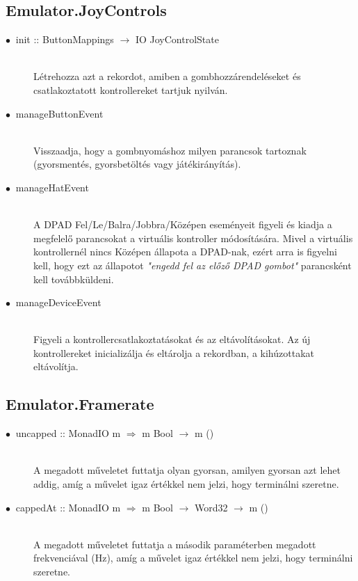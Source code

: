 \subsection{Emulator.JoyControls}

\begin{description}
	\item[$\bullet\:$ init :: ButtonMappings $\rightarrow$ IO JoyControlState] \hfill \\
	Létrehozza azt a rekordot, amiben a gombhozzárendeléseket és csatlakoztatott kontrollereket tartjuk nyilván.
	\item[$\bullet\:$ manageButtonEvent] \hfill \\
	Visszaadja, hogy a gombnyomáshoz milyen parancsok tartoznak (gyorsmentés, gyorsbetöltés vagy játékirányítás). 
	\item[$\bullet\:$ manageHatEvent] \hfill \\
	A DPAD Fel/Le/Balra/Jobbra/Középen eseményeit figyeli és kiadja a megfelelő parancsokat a virtuális kontroller módosítására. Mivel a virtuális kontrollernél nincs Középen állapota a DPAD-nak, ezért arra is figyelni kell, hogy ezt az állapotot \emph{"engedd fel az előző DPAD gombot"} parancsként kell továbbküldeni.
	\item[$\bullet\:$ manageDeviceEvent] \hfill \\
	Figyeli a kontrollercsatlakoztatásokat és az eltávolításokat.
	Az új kontrollereket inicializálja és eltárolja a rekordban, a kihúzottakat eltávolítja.
\end{description}

\subsection{Emulator.Framerate}

\begin{description}
	\item[$\bullet\:$ uncapped :: MonadIO m $\Rightarrow$ m Bool $\rightarrow$ m ()] \hfill \\
	A megadott műveletet futtatja olyan gyorsan, amilyen gyorsan azt lehet addig, amíg a művelet igaz értékkel nem jelzi, hogy terminálni szeretne.
	\item[$\bullet\:$ cappedAt :: MonadIO m $\Rightarrow$ m Bool $\rightarrow$ Word32 $\rightarrow$ m ()] \hfill \\
	A megadott műveletet futtatja a második paraméterben megadott frekvenciával (Hz), amíg a művelet igaz értékkel nem jelzi, hogy terminálni szeretne.
\end{description}

